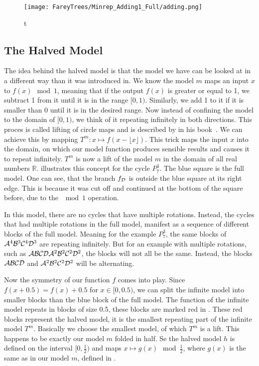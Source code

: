 \begin{figure}
	\centering
	\texttt{[image: FareyTrees/Minrep\_Adding1\_Full/adding.png]}
	\caption{t}
	\label{fig:tree.adding1.hor.full}
\end{figure}

\subsection{The Halved Model}

The idea behind the halved model is that the model we have can be looked at in a different way than it was introduced in.
We know the model $m$ maps an input $x$ to $f(x) \mod 1$, meaning that if the output $f(x)$ is greater or equal to 1, we subtract 1 from it until it is in the range $[0, 1)$.
Similarly, we add 1 to it if it is smaller than 0 until it is in the desired range.
Now instead of confining the model to the domain of $[0, 1)$, we think of it repeating infinitely in both directions.
This proces is called lifting of circle maps and is described by  in his book~\cite{devaney2021introduction}.
We can achieve this by mapping $T^m: x \mapsto f(x - \lfloor x \rfloor)$.
This trick maps the input $x$ into the domain, on which our model function produces sensible results and causes it to repeat infinitely.
$T^m$ is now a lift of the model $m$ in the domain of all real numbers $\mathbb{R}$.
 illustrates this concept for the cycle $P_7^3$.
The blue square is the full model.
One can see, that the branch $f_{\mathcal{D}}$ is outside the blue square at its right edge.
This is because it was cut off and continued at the bottom of the square before, due to the $\mod 1$ operation.


In this model, there are no cycles that have multiple rotations.
Instead, the cycles that had multiple rotations in the full model, manifest as a sequence of different blocks of the full model.
Meaning for the example $P_7^3$, the same blocks of $\mathcal{A}^4\mathcal{B}^3\mathcal{C}^4\mathcal{D}^3$ are repeating infinitely.
But for an example with multiple rotations, such as $\mathcal{A}\mathcal{B}\mathcal{C}\mathcal{D}\mathcal{A}^2\mathcal{B}^2\mathcal{C}^2\mathcal{D}^2$, the blocks will not all be the same.
Instead, the blocks $\mathcal{A}\mathcal{B}\mathcal{C}\mathcal{D}$ and $\mathcal{A}^2\mathcal{B}^2\mathcal{C}^2\mathcal{D}^2$ will be alternating.

Now the symmetry of our function $f$ comes into play.
Since $f(x + 0.5) = f(x) + 0.5$ for $x \in [0, 0.5)$, we can split the infinite model into smaller blocks than the blue block of the full model.
The function of the infinite model repeats in blocks of size 0.5, these blocks are marked red in .
These red blocks represent the halved model, it is the smallest repeating part of the infinite model $T^m$.
Basically we choose the smallest model, of which $T^m$ is a lift.
This happens to be exactly our model $m$ folded in half.
Se the halved model $h$ is defined on the interval $[0, \frac{1}{2})$ and maps $x \mapsto g(x) \mod \frac{1}{2}$, where $g(x)$ is the same as in our model $m$, defined in .


